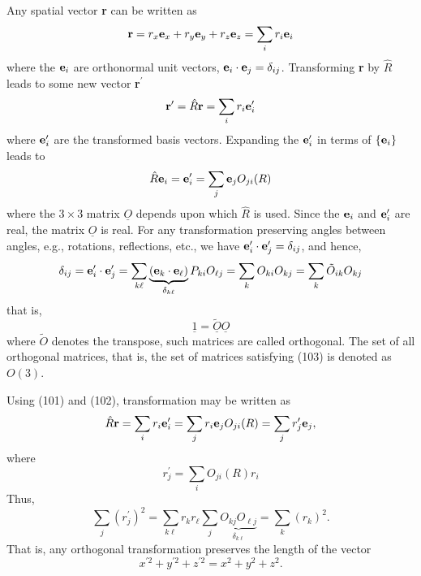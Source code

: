 Any spatial vector {\bf r} can be written as
\begin{equation}
{\bf r} = r_x {\bf e}_x + r_y {\bf e}_y + r_z {\bf e}_z = \sum_{i} 
r_i {\bf e}_i
\label{chap16-eqno100}
\end{equation}
where the ${\bf e}_i$ are orthonormal unit vectors, ${\bf e}_i \cdot 
{\bf e}_j = \delta_{ij}$.  Transforming {\bf r} by ${\hat{R}}$ leads 
to some new vector {\bf r}$^{\prime}$
\begin{equation}
{\bf r}^{\prime} = {\hat{R}} {\bf r} = \sum_{i} r_i 
{\bf e}_i^{\prime}
\label{chap16-eqno101}
\end{equation}
where ${\bf e}_i^{\prime}$ are the transformed basis vectors.  
Expanding the ${\bf e}_i^{\prime}$ in terms of $\{ {\bf e}_i\}$ leads 
to
\begin{equation}
{\hat{R}} {\bf e}_i = {\bf e}_i^{\prime} = \sum_{j} {\bf e}_j 
O_{ji}(R)
\label{chap16-eqno102}
\end{equation}
where the $3 \times 3$ matrix $\underline{O}$ depends upon which 
${\hat{R}}$ is used.  Since the ${\bf e}_i$ and ${\bf e}_i^{\prime}$ 
are real, the matrix $\underline{O}$ is real.  For any transformation 
preserving angles between angles, e.g., rotations, reflections, etc., 
we have ${\bf e}_i^{\prime} \cdot {\bf e}_j^{\prime} = \delta_{ij}$, 
and hence,
\begin{equation}
\delta_{ij} = {\bf e}_i^{\prime} \cdot {\bf e}_j^{\prime} = 
\sum_{k\ell} \underbrace{({\bf e}_k \cdot {\bf 
e}_{\ell})}_{\delta_{k\ell}} P_{ki} O_{\ell j} = \sum_{k} O_{ki} 
O_{kj} = \sum_{k} {\tilde{O}}_{ik} O_{kj}
\end{equation}
that is,
\begin{equation}
\underline{1} = {\underline{\tilde O}} \underline{O}
\label{chap16-eqno103}
\end{equation}
where $\tilde{O}$ denotes the transpose, such matrices are called 
orthogonal.  The set of all orthogonal matrices, that is, the set of 
matrices satisfying (103) is denoted as $O(3)$.

Using (101) and (102), transformation may be written as
\begin{equation}
{\hat{R}} {\bf r} = \sum_{i} r_i {\bf e}_i^{\prime} = \sum_{j} r_i 
{\bf e}_j O_{ji} (R) = \sum_{j} r^{\prime}_j {\bf e}_j ,
\end{equation}
where
\begin{equation}
r^{\prime}_j = \sum_{i} O_{ji} (R) r_i
\end{equation}
Thus,
\begin{equation}
\sum_{j} \left( r^{\prime}_j \right)^2 = \sum_{k\ell} r_k r_{\ell} 
\sum_{j} \underbrace{O_{kj}O_{\ell j}}_{\delta_{k\ell}} = \sum_{k} 
(r_k)^2 .
\end{equation}
That is, any orthogonal transformation preserves the length of the 
vector
\begin{equation}
x^{\prime 2} + y^{\prime 2} + z^{\prime 2} = x^2 + y^2 + 
z^2.
\label{chap16-eqno104}
\end{equation}


